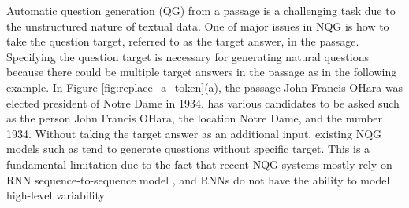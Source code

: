 \documentclass[letterpaper]{article} %
\newcommand{\kj}[1]{\textcolor{red}{#1}}
\newcommand{\jb}[1]{\textcolor{cyan}{#1}}
\begin{document}
Automatic question generation (QG) from a passage is a challenging task due to the unstructured nature of textual data. One of major issues in NQG is how to take the question target, referred to as the target answer, in the passage. Specifying the question target is necessary for generating natural questions because there could be multiple target answers in the passage as in the following example. In Figure \ref{fig:replace_a_token}(a), the passage John Francis OHara was elected president of Notre Dame in 1934. has various candidates to be asked such as the person John Francis OHara, the location Notre Dame, and the number 1934. Without taking the target answer as an additional input, existing NQG models such as \cite{du2017learning} tend to generate questions without specific target. This is a fundamental limitation due to the fact that recent NQG systems mostly rely on RNN sequence-to-sequence model \cite{sutskever2014sequence,bahdanau2014neural}, and RNNs do not have the ability to model high-level variability \cite{serban2017hierarchical}.
% 
% 
% 
% 

\end{document}
